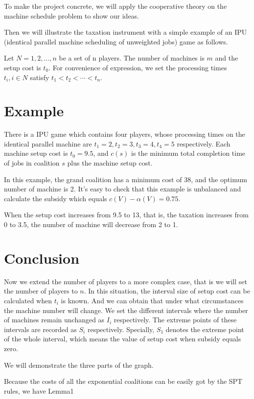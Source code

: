 \documentclass[UTF8]{article}
\begin{document}
To make the project concrete, we will apply the cooperative theory on the machine schedule problem to show our ideas.


Then we will illustrate the taxation instrument with a simple example of an IPU (identical parallel machine scheduling of unweighted jobs) game as follows.


Let $N={1,2,\ldots,n}$ be a set of n players. The number of machines is $m$ and the setup cost is $t_0$.
For convenience of expression, we set the processing times $t_i, i\in N$ satisfy $t_1<t_2<\cdots<t_n$.

\section{Example}

There is a IPU game which contains four players, whose processing times on the identical parallel machine are $t_1=2,t_2=3,t_3=4,t_4=5$ respectively. Each machine setup cost is $t_0=9.5$, and $c(s)$ is the minimum total completion time of jobs in coalition $s$ plus the machine setup cost.

In this example, the grand coalition has a minimum cost of 38, and the optimum number of machine is 2.
It's easy to check that this example is unbalanced and calculate the subsidy which equals $ c(V) - \alpha(V) = 0.75$.

When the setup cost increases from 9.5 to 13, that is, the taxation increases from 0 to 3.5,
the number of machine will decrease from 2 to 1.

\section{Conclusion}
Now we extend the number of players to a more complex case, that is we will set the number of players to $n$.
In this situation, the interval size of setup cost can be calculated when $t_i$ is known. And we can obtain that under what circumstances the machine number will change. We set the different intervals where the number of machines remain unchanged as $I_i$ respectively. The extreme points of these intervals are recorded as $S_i$ respectively. Specially, $S_1$ denotes the extreme point of the whole interval, which means the value of setup cost when subsidy equals zero.


We will demonstrate the three parts of the graph.




Because the costs of all the exponential coalitions can be easily got by the SPT rules, we have Lemma1
\end{document}
